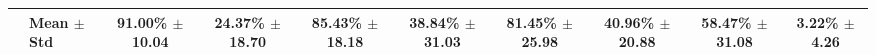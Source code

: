 \begin{table}[t]
{\begin{tabular}{ll*{8}{c}}
\midrule
 & \textbf{Mean $\pm$ Std} & 91.00\% $\pm$ 10.04 & 24.37\% $\pm$ 18.70 & 85.43\% $\pm$ 18.18 & 38.84\% $\pm$ 31.03 & 81.45\% $\pm$ 25.98 & 40.96\% $\pm$ 20.88 & 58.47\% $\pm$ 31.08 & 3.22\% $\pm$ 4.26 \\
\bottomrule
\end{tabular}
}
\end{table}
